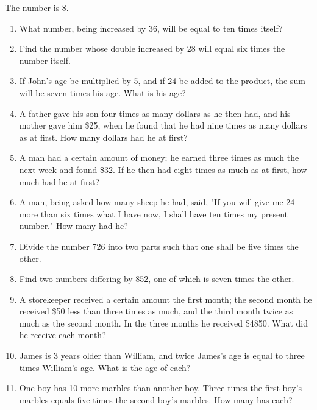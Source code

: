 \documentclass{book}
\begin{document}
The number is 8.

\begin{enumerate}

\item What number, being increased by 36, will be equal to ten
times itself?

\item Find the number whose double increased by 28 will equal six
times the number itself.

\item If John's age be multiplied by 5, and if 24 be added to the
product, the sum will be seven times his age. What is his age?

\item A father gave his son four times as many dollars as he then
had, and his mother gave him \$25, when he found that he had nine
times as many dollars as at first. How many dollars had he at
first?

\item A man had a certain amount of money; he earned three times
as much the next week and found \$32. If he then had eight times
as much as at first, how much had he at first?

\item A man, being asked how many sheep he had, said, "If you will
give me 24 more than six times what I have now, I shall have ten
times my present number." How many had he?

\item Divide the number 726 into two parts such that one shall be
five times the other.

\item Find two numbers differing by 852, one of which is seven
times the other.

\item A storekeeper received a certain amount the first month; the
second month he received \$50 less than three times as much, and
the third month twice as much as the second month. In the three
months he received \$4850. What did he receive each month?

\item James is 3 years older than William, and twice James's age
is equal to three times William's age. What is the age of each?

\item One boy has 10 more marbles than another boy. Three times
the first boy's marbles equals five times the second boy's
marbles. How many has each?


\end{enumerate}
\end{document}

